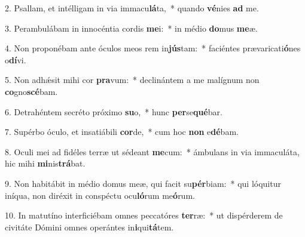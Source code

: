 2. Psallam, et intélligam in via immacu\textbf{lá}ta,~*  quando \textbf{vé}nies \textbf{ad} me.\

3. Perambulábam in innocéntia cordis \textbf{me}i:~*  in médio \textbf{do}mus \textbf{me}æ.\

4. Non proponébam ante óculos meos rem in\textbf{jús}tam:~*  faciéntes prævaricati\textbf{ó}nes o\textbf{dí}vi.\

5. Non adhǽsit mihi cor \textbf{pra}vum:~*  declinántem a me malígnum non \textbf{co}gno\textbf{scé}bam.\

6. Detrahéntem secréto próximo \textbf{su}o,~*  hunc \textbf{per}se\textbf{qué}bar.\

7. Supérbo óculo, et insatiábili \textbf{cor}de,~*  cum hoc \textbf{non} e\textbf{dé}bam.\

8. Oculi mei ad fidéles terræ ut sédeant \textbf{me}cum:~*  ámbulans in via immaculáta, hic mihi \textbf{mi}nis\textbf{trá}bat.\

9. Non habitábit in médio domus meæ, qui facit su\textbf{pér}biam:~*  qui lóquitur iníqua, non diréxit in conspéctu ocu\textbf{ló}rum me\textbf{ó}rum.\

10. In matutíno interficiébam omnes peccatóres \textbf{ter}ræ:~*  ut dispérderem de civitáte Dómini omnes operántes in\textbf{i}qui\textbf{tá}tem.\

